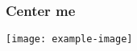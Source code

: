 \documentclass[14pt]{beamer}
\title{}
\date{}
\begin{document}
    \begin{frame}
        \frametitle{Center me}
        \vfill
        \centering
        \texttt{[image: example-image]}
        \vfill
    \end{frame}   
\end{document}
